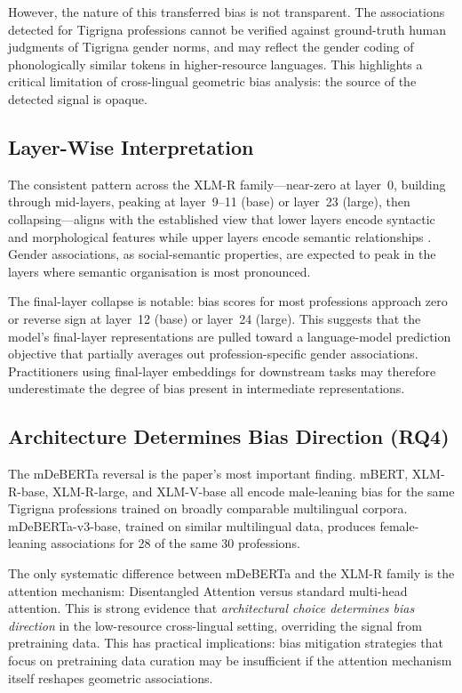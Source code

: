 \documentclass[10pt]{article}
\begin{document}
However, the nature of this transferred bias is not transparent. The
associations detected for Tigrigna professions cannot be verified against
ground-truth human judgments of Tigrigna gender norms, and may reflect
the gender coding of phonologically similar tokens in higher-resource
languages. This highlights a critical limitation of cross-lingual
geometric bias analysis: the source of the detected signal is opaque.

\subsection{Layer-Wise Interpretation}

The consistent pattern across the XLM-R family---near-zero at layer~0,
building through mid-layers, peaking at layer~9--11 (base) or layer~23
(large), then collapsing---aligns with the established view that lower
layers encode syntactic and morphological features while upper layers
encode semantic relationships \citep{tenney-etal-2019-bert,rogers2020primer}.
Gender associations, as social-semantic properties, are expected to peak
in the layers where semantic organisation is most pronounced.

The final-layer collapse is notable: bias scores for most professions
approach zero or reverse sign at layer~12 (base) or layer~24 (large).
This suggests that the model's final-layer representations are pulled
toward a language-model prediction objective that partially averages out
profession-specific gender associations. Practitioners using final-layer
embeddings for downstream tasks may therefore underestimate the degree
of bias present in intermediate representations.

\subsection{Architecture Determines Bias Direction (RQ4)}

The mDeBERTa reversal is the paper's most important finding. mBERT,
XLM-R-base, XLM-R-large, and XLM-V-base all encode male-leaning bias
for the same Tigrigna professions trained on broadly comparable multilingual
corpora. mDeBERTa-v3-base, trained on similar multilingual data, produces
female-leaning associations for 28 of the same 30 professions.

The only systematic difference between mDeBERTa and the XLM-R family is
the attention mechanism: Disentangled Attention versus standard multi-head
attention. This is strong evidence that \emph{architectural choice
determines bias direction} in the low-resource cross-lingual setting,
overriding the signal from pretraining data. This has practical implications:
bias mitigation strategies that focus on pretraining data curation may be
insufficient if the attention mechanism itself reshapes geometric associations.
\end{document}
